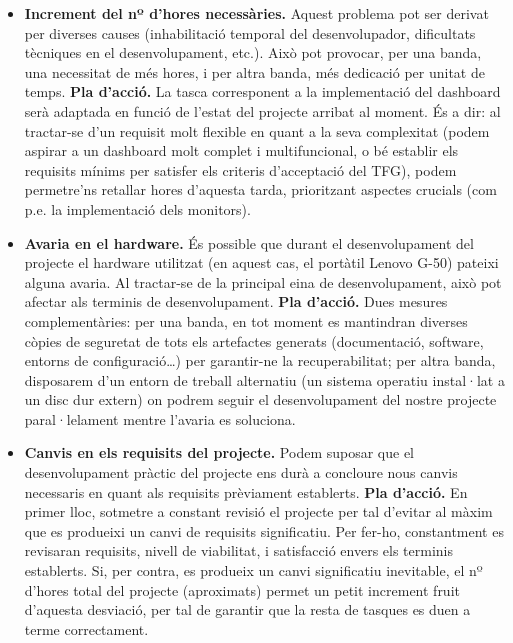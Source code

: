 \begin{itemize}
\item \textbf{Increment del nº d’hores necessàries.} Aquest problema pot ser derivat per diverses causes (inhabilitació temporal del desenvolupador, dificultats tècniques en el desenvolupament, etc.). Això pot provocar, per una banda, una necessitat de més hores, i per altra banda, més dedicació per unitat de temps.
\subitem \textbf{Pla d’acció.} La tasca corresponent a la implementació del dashboard serà adaptada en funció de l’estat del projecte arribat al moment. És a dir: al tractar-se d’un requisit molt flexible en quant a la seva complexitat (podem aspirar a un dashboard molt complet i multifuncional, o bé establir els requisits mínims per satisfer els criteris d’acceptació del TFG), podem permetre’ns retallar hores d’aquesta tarda, prioritzant aspectes crucials (com p.e. la implementació dels monitors). 
\item \textbf{Avaria en el hardware.} És possible que durant el desenvolupament del projecte el hardware utilitzat (en aquest cas, el portàtil Lenovo G-50) pateixi alguna avaria. Al tractar-se de la principal eina de desenvolupament, això pot afectar als terminis de desenvolupament.
\subitem \textbf{Pla d’acció.} Dues mesures complementàries: per una banda, en tot moment es mantindran diverses còpies de seguretat de tots els artefactes generats (documentació, software, entorns de configuració…) per garantir-ne la recuperabilitat; per altra banda, disposarem d’un entorn de treball alternatiu (un sistema operatiu instal·lat a un disc dur extern) on podrem seguir el desenvolupament del nostre projecte paral·lelament mentre l’avaria es soluciona.
\item \textbf{Canvis en els requisits del projecte.} Podem suposar que el desenvolupament pràctic del projecte ens durà a concloure nous canvis necessaris en quant als requisits prèviament establerts.
\subitem \textbf{Pla d’acció.} En primer lloc, sotmetre a constant revisió el projecte per tal d’evitar al màxim que es produeixi un canvi de requisits significatiu. Per fer-ho, constantment es revisaran requisits, nivell de viabilitat, i satisfacció envers els terminis establerts. Si, per contra, es produeix un canvi significatiu inevitable, el nº d’hores total del projecte (aproximats) permet un petit increment fruit d’aquesta desviació, per tal de garantir que la resta de tasques es duen a terme correctament.
\end{itemize}


